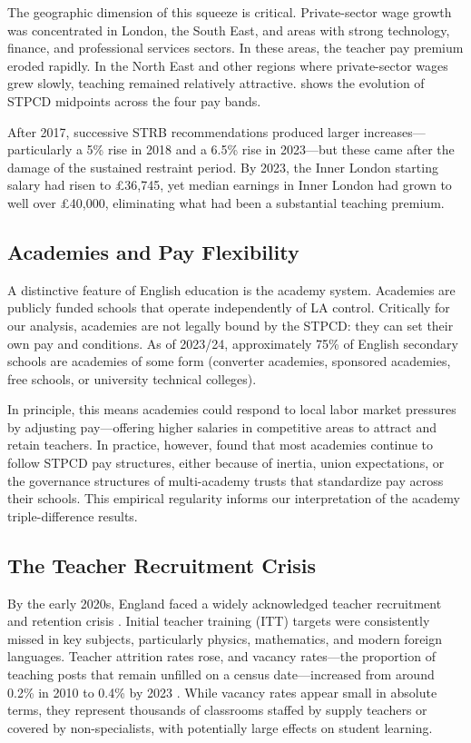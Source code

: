 \documentclass[12pt]{article}
\begin{document}
The geographic dimension of this squeeze is critical. Private-sector wage growth was concentrated in London, the South East, and areas with strong technology, finance, and professional services sectors. In these areas, the teacher pay premium eroded rapidly. In the North East and other regions where private-sector wages grew slowly, teaching remained relatively attractive.  shows the evolution of STPCD midpoints across the four pay bands.

After 2017, successive STRB recommendations produced larger increases---particularly a 5\% rise in 2018 and a 6.5\% rise in 2023---but these came after the damage of the sustained restraint period. By 2023, the Inner London starting salary had risen to \pounds36,745, yet median earnings in Inner London had grown to well over \pounds40,000, eliminating what had been a substantial teaching premium.

\subsection{Academies and Pay Flexibility}

A distinctive feature of English education is the academy system. Academies are publicly funded schools that operate independently of LA control. Critically for our analysis, academies are not legally bound by the STPCD: they can set their own pay and conditions. As of 2023/24, approximately 75\% of English secondary schools are academies of some form (converter academies, sponsored academies, free schools, or university technical colleges).

In principle, this means academies could respond to local labor market pressures by adjusting pay---offering higher salaries in competitive areas to attract and retain teachers. In practice, however, \citet{britton2016teacher} found that most academies continue to follow STPCD pay structures, either because of inertia, union expectations, or the governance structures of multi-academy trusts that standardize pay across their schools. This empirical regularity informs our interpretation of the academy triple-difference results.

\subsection{The Teacher Recruitment Crisis}

By the early 2020s, England faced a widely acknowledged teacher recruitment and retention crisis \citep{sims2020teacher, allen2018teacher}. Initial teacher training (ITT) targets were consistently missed in key subjects, particularly physics, mathematics, and modern foreign languages. Teacher attrition rates rose, and vacancy rates---the proportion of teaching posts that remain unfilled on a census date---increased from around 0.2\% in 2010 to 0.4\% by 2023 \citep{epi2019teacher, ifs2019teacher}. While vacancy rates appear small in absolute terms, they represent thousands of classrooms staffed by supply teachers or covered by non-specialists, with potentially large effects on student learning.
\end{document}
